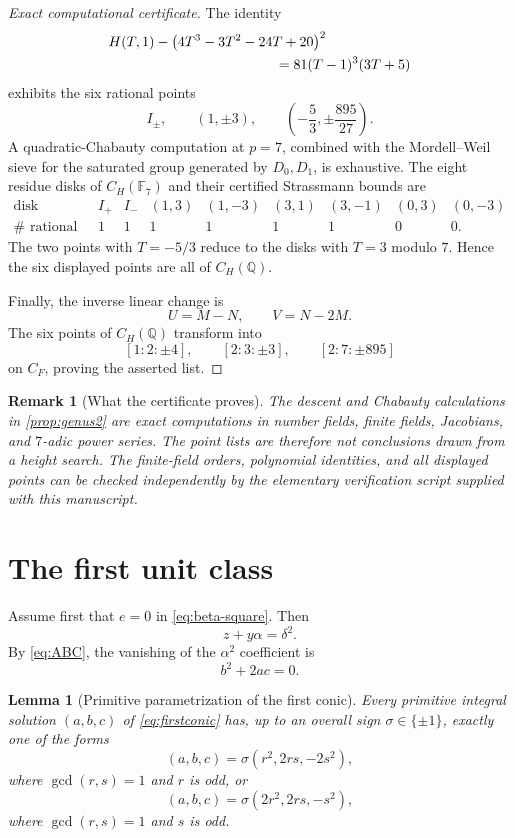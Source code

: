 \documentclass[11pt,a4paper]{article}
\newtheorem{lemma}[lemma]{Lemma}
\newtheorem{remark}[remark]{Remark}
\newcommand{\Q}{\mathbb Q}
\newcommand{\F}{\mathbb F}
\begin{document}
\begin{proof}[Exact computational certificate]
The identity
\begin{align}
&H(T,1)-\bigl(4T^3-3T^2-24T+20\bigr)^2
\notag\\
&\hspace{42mm}=81(T-1)^3(3T+5)
\label{eq:Hidentity}
\end{align}
exhibits the six rational points
\[
I_\pm,
\qquad
(1,\pm3),
\qquad
\left(-\frac53,\pm\frac{895}{27}\right).
\]
A quadratic-Chabauty computation at $p=7$, combined with the
Mordell--Weil sieve for the saturated group generated by $D_0,D_1$, is
exhaustive.  The eight residue disks of $C_H(\F_7)$ and their certified
Strassmann bounds are
\[
\begin{array}{c|cccccccc}
\text{disk}
&I_+&I_-&(1,3)&(1,-3)&(3,1)&(3,-1)&(0,3)&(0,-3)\\ \hline
\#\text{ rational points}
&1&1&1&1&1&1&0&0.
\end{array}
\]
The two points with $T=-5/3$ reduce to the disks with $T=3$ modulo $7$.
Hence the six displayed points are all of $C_H(\Q)$.

Finally, the inverse linear change is
\[
U=M-N,
\qquad
V=N-2M.
\]
The six points of $C_H(\Q)$ transform into
\[
[1:2:\pm4],
\qquad
[2:3:\pm3],
\qquad
[2:7:\pm895]
\]
on $C_F$, proving the asserted list.
\end{proof}

\begin{remark}[What the certificate proves]\label{rem:certificate}
The descent and Chabauty calculations in \cref{prop:genus2} are exact
computations in number fields, finite fields, Jacobians, and $7$-adic power
series.  The point lists are therefore not conclusions drawn from a height
search.  The finite-field orders, polynomial identities, and all displayed
points can be checked independently by the elementary verification script
supplied with this manuscript.
\end{remark}

\section{The first unit class}

Assume first that $e=0$ in \eqref{eq:beta-square}.  Then
\[
z+y\alpha=\delta^2.
\]
By \eqref{eq:ABC}, the vanishing of the $\alpha^2$ coefficient is
\begin{equation}\label{eq:firstconic}
b^2+2ac=0.
\end{equation}

\begin{lemma}[Primitive parametrization of the first conic]\label{lem:firstparam}
Every primitive integral solution $(a,b,c)$ of \eqref{eq:firstconic} has,
up to an overall sign $\sigma\in\{\pm1\}$, exactly one of the forms
\begin{equation}\label{eq:firstfamily}
(a,b,c)=\sigma(r^2,2rs,-2s^2),
\end{equation}
where $\gcd(r,s)=1$ and $r$ is odd, or
\begin{equation}\label{eq:secondfamily}
(a,b,c)=\sigma(2r^2,2rs,-s^2),
\end{equation}
where $\gcd(r,s)=1$ and $s$ is odd.
\end{lemma}
\end{document}

